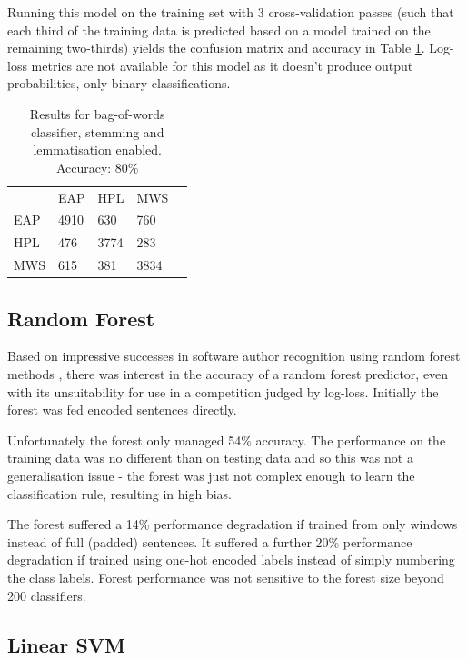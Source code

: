 Running this model on the training set with 3 cross-validation passes (such that each third of the training data is predicted based on a model trained on the remaining two-thirds) yields the confusion matrix and accuracy in Table \ref{tab:bow_cw}. Log-loss metrics are not available for this model as it doesn't produce output probabilities, only binary classifications.

\begin{table}[h]
\centering
\begin{tabular}{m{1cm}|m{1cm}|m{1cm}|m{1cm}|m{0cm}}
\multicolumn{1}{m{1cm}}{} & \multicolumn{1}{m{1cm}}{EAP} & \multicolumn{1}{m{1cm}}{HPL} & \multicolumn{1}{m{1cm}}{MWS} &\\[5pt]
\cline{2-4}
EAP & 4910 & 630 & 760 & \\[5pt]
\cline{2-4}
HPL & 476 & 3774 & 283 & \\[5pt]
\cline{2-4}
MWS & 615 & 381 & 3834 & \\[5pt]
\cline{2-4}
\end{tabular}
\caption{Results for bag-of-words classifier, stemming and lemmatisation enabled.\\Accuracy: 80\%}
\label{tab:bow_cw}
\end{table}

\subsection{Random Forest}
\label{sec:forest}

Based on impressive successes in software author recognition using random forest
methods \cite{c3}, there was interest in the accuracy of a random forest
predictor, even with its unsuitability for use in a competition judged by
log-loss. Initially the forest was fed encoded sentences directly.

Unfortunately the forest only managed 54\% accuracy. The performance
on the training data was no different than on testing data and so this was not a
generalisation issue - the forest was just not complex enough to learn the
classification rule, resulting in high bias.

The forest suffered a 14\% performance degradation if trained from only windows
instead of full (padded) sentences. It suffered a further 20\% performance
degradation if trained using one-hot encoded labels instead of simply numbering
the class labels. Forest performance was not sensitive to the forest size beyond
200 classifiers. 

\subsection{Linear SVM}
\label{sec:svm}

